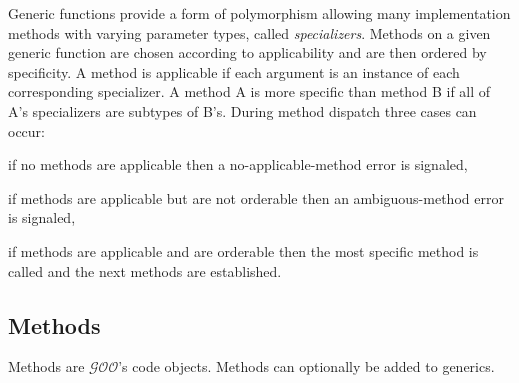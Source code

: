 \documentclass[twoside,twocolumn,9pt]{extarticle}
\newcommand{\goo}{$\mathcal{GOO}$}
\begin{document}
Generic functions provide a form of polymorphism allowing many
implementation methods with varying parameter types, called
{\it specializers}.  Methods on a given generic function are chosen
according to applicability and are then ordered by specificity.
A method is applicable if each argument is an instance of each
corresponding specializer.
A method A is more specific than method B
if all of A's specializers are subtypes of B's.  
During method dispatch three cases can occur:
\begin{packeditemize}
\item if no methods are applicable then a no-applicable-method error
is signaled,
\item if methods are applicable but are not orderable then an
ambiguous-method error is signaled,
\item if methods are applicable and are orderable then the most
specific method is called and the next methods are established.
\end{packeditemize}

\begin{defs}
\end{defs}

\subsection{Methods}

Methods are \goo's code objects.  Methods can optionally be added to
generics. 

\begin{defs}
\end{defs}
\end{document}
